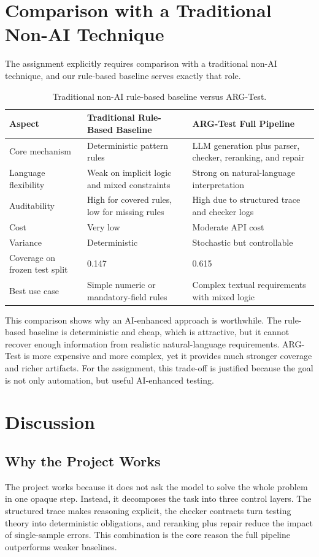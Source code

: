 \documentclass{article}
\begin{document}
\section{Comparison with a Traditional Non-AI Technique}
The assignment explicitly requires comparison with a traditional non-AI technique, and our rule-based baseline serves exactly that role.

\begin{table}[t]
\centering
\small
\begin{tabular}{p{} p{} p{}}
\toprule
\textbf{Aspect} & \textbf{Traditional Rule-Based Baseline} & \textbf{ARG-Test Full Pipeline} \\
\midrule
Core mechanism & Deterministic pattern rules & LLM generation plus parser, checker, reranking, and repair \\
Language flexibility & Weak on implicit logic and mixed constraints & Strong on natural-language interpretation \\
Auditability & High for covered rules, low for missing rules & High due to structured trace and checker logs \\
Cost & Very low & Moderate API cost \\
Variance & Deterministic & Stochastic but controllable \\
Coverage on frozen test split & 0.147 & 0.615 \\
Best use case & Simple numeric or mandatory-field rules & Complex textual requirements with mixed logic \\
\bottomrule
\end{tabular}
\caption{Traditional non-AI rule-based baseline versus ARG-Test.}
\label{tab:nonai}
\end{table}

This comparison shows why an AI-enhanced approach is worthwhile. The rule-based baseline is deterministic and cheap, which is attractive, but it cannot recover enough information from realistic natural-language requirements. ARG-Test is more expensive and more complex, yet it provides much stronger coverage and richer artifacts. For the assignment, this trade-off is justified because the goal is not only automation, but useful AI-enhanced testing.

\section{Discussion}

\subsection{Why the Project Works}
The project works because it does not ask the model to solve the whole problem in one opaque step. Instead, it decomposes the task into three control layers. The structured trace makes reasoning explicit, the checker contracts turn testing theory into deterministic obligations, and reranking plus repair reduce the impact of single-sample errors. This combination is the core reason the full pipeline outperforms weaker baselines.
\end{document}
